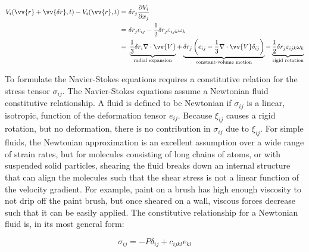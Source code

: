 \documentclass[10pt]{article}
\numberwithin{equation}{section} %
\begin{document}
\begin{equation}
\label{eq:MotionAtaPoint}
\begin{aligned}
V_i(\vv{r}+\vv{\delta r}, t)-V_i(\vv{r},t)=&\ \delta r_j\frac{\partial V_i}{\partial x_j}\hspace{6.38cm}\\
=&\ \delta r_je_{ij}-\frac{1}{2}\delta r_j\varepsilon_{ijk}\omega_k\hspace{4.47cm}\\
=&\ \underbrace{\frac{1}{3}\delta r_i\nabla\cdot\vv{V}}_\text{radial expansion}+\underbrace{\delta r_j\left(e_{ij}-\frac{1}{3}\nabla\cdot\vv{V}\delta_{ij}\right)}_\text{constant-volume motion}-\underbrace{\frac{1}{2}\delta r_j\varepsilon_{ijk}\omega_k}_\text{rigid rotation}\\
\end{aligned}
\end{equation}

To formulate the Navier-Stokes equations requires a constitutive relation for the stress tensor \(\sigma_{ij}\). The Navier-Stokes equations assume a Newtonian fluid constitutive relationship. A fluid is defined to be Newtonian if \(\sigma_{ij}\) is a linear, isotropic, function of the deformation tensor \(e_{ij}\). Because \(\xi_{ij}\) causes a rigid rotation, but no deformation, there is no contribution in \(\sigma_{ij}\) due to \(\xi_{ij}\). For simple fluids, the Newtonian approximation is an excellent assumption over a wide range of strain rates, but for molecules consisting of long chains of atoms, or with suspended solid particles, shearing the fluid breaks down an internal structure that can align the molecules such that the shear stress is not a linear function of the velocity gradient. For example, paint on a brush has high enough viscosity to not drip off the paint brush, but once sheared on a wall, viscous forces decrease such that it can be easily applied. The constitutive relationship for a Newtonian fluid is, in its most general form:

\begin{equation}
\label{eq:Newtonian1}
\sigma_{ij}=-P\delta_{ij}+c_{ijkl}e_{kl}
\end{equation}
\end{document}
